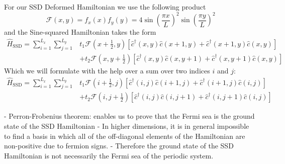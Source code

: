 \documentclass[11pt, a4paper]{article}
\theoremstyle{definition} %
\begin{document}
	
For our SSD Deformed Hamiltonian we use the following product
\begin{equation}
	\mathcal{F}(x,y) = f_x(x)f_y(y) = 4\sin(\frac{\pi x}{L})^2\sin(\frac{\pi y}{L})^2
\end{equation}
and the Sine-squared Hamiltonian takes the form
\begin{equation}
\begin{split}
\hat{H}_\text{SSD} = \sum_{i=1}^{L_x} \sum_{j=1}^{L_y} &t_1 \mathcal{F}\left(x+\frac{1}{2}, y\right) \left[ \hat{c}^\dagger(x,y)\hat{c}(x+1, y) + \hat{c}^\dagger(x+1,y) \hat{c}(x,y)\right] \\
&+ t_2 \mathcal{F}\left(x, y+ \frac{1}{2}\right) \left[\hat{c}^\dagger(x, y) \hat{c}(x, y + 1) + \hat{c}^\dagger(x, y+1) \hat{c}(x,y) \right]
\end{split}
\end{equation}
Which we will formulate with the help over a sum over two indices $i$ and $j$:
\begin{equation}
	\begin{split}
		\hat{H}_\text{SSD} = \sum_{i=1}^{L_x} \sum_{j=1}^{L_y} &t_1 \mathcal{F}\left(i+\frac{1}{2}, j\right) \left[ \hat{c}^\dagger(i,j)\hat{c}(i+1, j) + \hat{c}^\dagger(i+1,j) \hat{c}(i,j)\right] \\
&+ t_2 \mathcal{F}\left(i, j + \frac{1}{2}\right) \left[\hat{c}^\dagger(i, j) \hat{c}(i, j + 1) + \hat{c}^\dagger(i, j+1) \hat{c}(i,j) \right]
	\end{split}
\end{equation}
	
	- Perron-Frobenius theorem: enables us to prove that the Fermi sea is the ground state of the SSD Hamiltonian
	- In higher dimensions, it is in general impossible to find a basis in which all of the off-diagonal elements of the Hamiltonian are non-positive due to fermion signs.
	- Therefore the ground state of the SSD Hamiltonian is not necessarily the Fermi sea of the periodic system.
	
\end{document}
